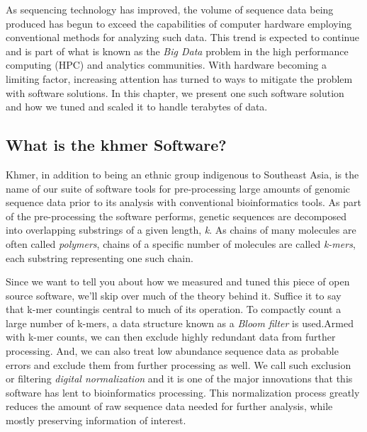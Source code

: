 \documentclass{article}
\newcommand{\comment}[2]{#2}
\begin{document}

As sequencing technology has improved, the volume of sequence data being produced has begun to exceed the capabilities of computer hardware employing conventional methods for analyzing such data. This trend is expected to continue and is part of what is known as the \textit{Big Data} problem in the high performance computing (HPC) and analytics communities. With hardware becoming a limiting factor, increasing attention has turned to ways to mitigate the problem with software solutions. In this chapter, we present one such software solution and how we tuned and scaled it to handle terabytes of data.

\subsection{What is the khmer Software?}

Khmer, in addition to being an ethnic group indigenous to Southeast Asia, is the name of our suite of software tools \citep{web:khmer} for pre-processing large amounts of genomic sequence data prior to its analysis with conventional bioinformatics tools. As part of the pre-processing the software performs, genetic sequences are decomposed into overlapping substrings of a given length, \textit{k}. As chains of many molecules are often called \textit{polymers}, chains of a specific number of molecules are called \textit{k-mers}, each substring representing one such chain. 



Since we want to tell you about how we measured and tuned this piece of open source software, we'll skip over much of the theory behind it. Suffice it to say that k-mer counting\comment{Elaborate?} is central to much of its operation. To compactly count a large number of k-mers, a data structure known as a \textit{Bloom filter} is used.\comment{briefly explain bloom filters} Armed with k-mer counts, we can then exclude highly redundant data from further processing. And, we can also treat low abundance sequence data as probable errors and exclude them from further processing as well. We call such exclusion or filtering \textit{digital normalization} and it is one of the major innovations that this software has lent to bioinformatics processing. This normalization process greatly reduces the amount of raw sequence data needed for further analysis, while mostly preserving information of interest.
\end{document}
